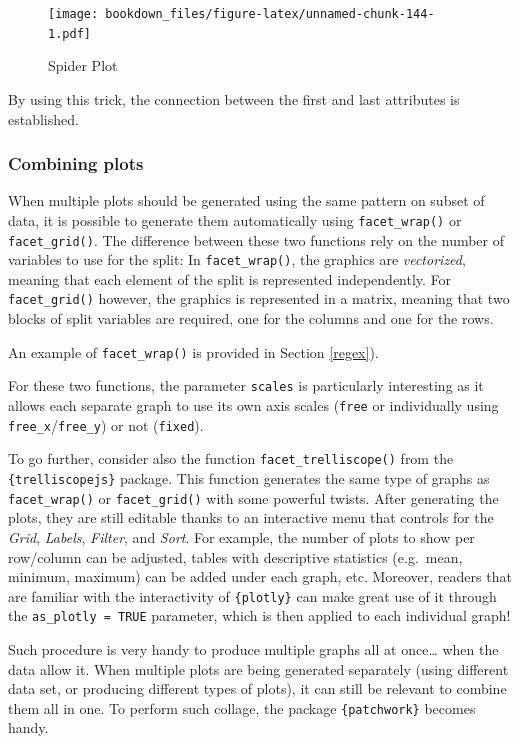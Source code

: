 \documentclass[
]{krantz}
\begin{document}
\begin{figure}
\centering
\texttt{[image: bookdown\_files/figure-latex/unnamed-chunk-144-1.pdf]}
\caption{\label{fig:unnamed-chunk-144}Spider Plot}
\end{figure}

By using this trick, the connection between the first and last attributes is established.

\hypertarget{combiningplots}{%
\subsubsection*{Combining plots}\label{combiningplots}}


When multiple plots should be generated using the same pattern on subset of data, it is possible to generate them automatically using \texttt{facet\_wrap()} or \texttt{facet\_grid()}. The difference between these two functions rely on the number of variables to use for the split: In \texttt{facet\_wrap()}, the graphics are \emph{vectorized}, meaning that each element of the split is represented independently. For \texttt{facet\_grid()} however, the graphics is represented in a matrix, meaning that two blocks of split variables are required, one for the columns and one for the rows.

An example of \texttt{facet\_wrap()} is provided in Section \ref{regex}).

For these two functions, the parameter \texttt{scales} is particularly interesting as it allows each separate graph to use its own axis scales (\texttt{free} or individually using \texttt{free\_x}/\texttt{free\_y}) or not (\texttt{fixed}).

To go further, consider also the function \texttt{facet\_trelliscope()} from the \texttt{\{trelliscopejs\}} package. This function generates the same type of graphs as \texttt{facet\_wrap()} or \texttt{facet\_grid()} with some powerful twists. After generating the plots, they are still editable thanks to an interactive menu that controls for the \emph{Grid}, \emph{Labels}, \emph{Filter}, and \emph{Sort}. For example, the number of plots to show per row/column can be adjusted, tables with descriptive statistics (e.g.~mean, minimum, maximum) can be added under each graph, etc. Moreover, readers that are familiar with the interactivity of \texttt{\{plotly\}} can make great use of it through the \texttt{as\_plotly\ =\ TRUE} parameter, which is then applied to each individual graph!

Such procedure is very handy to produce multiple graphs all at once\ldots{} when the data allow it.
When multiple plots are being generated separately (using different data set, or producing different types of plots), it can still be relevant to combine them all in one. To perform such collage, the package \texttt{\{patchwork\}} becomes handy.
\end{document}
